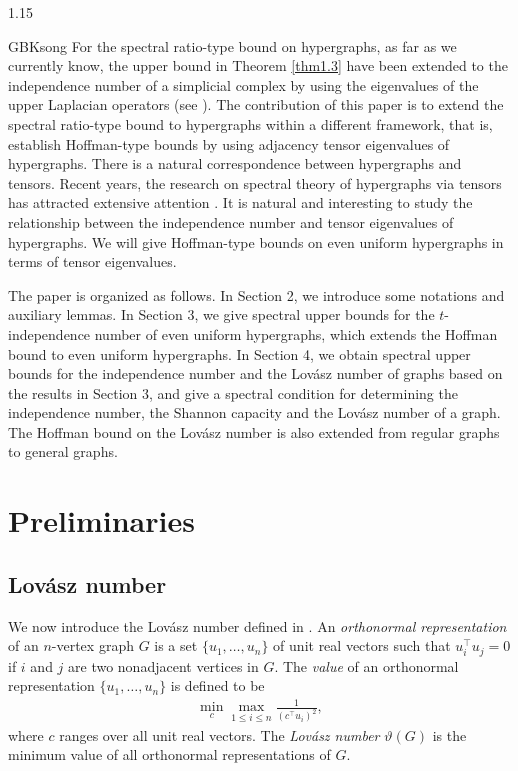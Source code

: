 \documentclass[preprint,12pt]{elsarticle}
\begin{document}
\begin{spacing}{1.15}
\begin{CJK*}{GBK}{song}
For the spectral ratio-type bound on hypergraphs, as far as we currently know, the upper bound in Theorem \ref{thm1.3} have been extended to the independence number of a simplicial complex by using the eigenvalues of the upper Laplacian operators (see \cite{Bachoc,Golubev}). The contribution of this paper is to extend the spectral ratio-type bound to hypergraphs within a different framework, that is, establish Hoffman-type bounds by using adjacency tensor eigenvalues of hypergraphs. There is a natural correspondence between hypergraphs and tensors. Recent years, the research on spectral theory of hypergraphs via tensors has attracted extensive attention \cite{Abiad,Chen,Clark,Cooper,Ellingham,Fan,Gao,LiMohar,LiSu}. It is natural and interesting to study the relationship between the independence number and tensor eigenvalues of hypergraphs. We will give Hoffman-type bounds on even uniform hypergraphs in terms of tensor eigenvalues.

The paper is organized as follows. In Section 2, we introduce some notations and auxiliary lemmas. In Section 3, we give spectral upper bounds for the $t$-independence number of even uniform hypergraphs, which extends the Hoffman bound to even uniform hypergraphs. In Section 4, we obtain spectral upper bounds for the independence number and the Lov\'{a}sz number of graphs based on the results in Section 3, and give a spectral condition for determining the independence number, the Shannon capacity and the Lov\'{a}sz number of a graph. The Hoffman bound on the Lov\'{a}sz number is also extended from regular graphs to general graphs.

\section{Preliminaries}

\subsection{Lov\'{a}sz number}
We now introduce the Lov\'{a}sz number defined in \cite{L}. An \textit{orthonormal representation} of an $n$-vertex graph $G$ is a set $\{u_1,\ldots,u_n\}$ of unit real vectors such that $u_i^\top u_j=0$ if $i$ and $j$ are two nonadjacent vertices in $G$. The \textit{value} of an orthonormal representation $\{u_1,\ldots,u_n\}$ is defined to be
\begin{eqnarray*}
\min_c\max_{1\leq i\leq n}\frac{1}{(c^\top u_i)^2},
\end{eqnarray*}
where $c$ ranges over all unit real vectors. The \textit{Lov\'{a}sz number} $\vartheta(G)$ is the minimum value of all orthonormal representations of $G$.


\end{CJK*}
\end{spacing}
\end{document}

